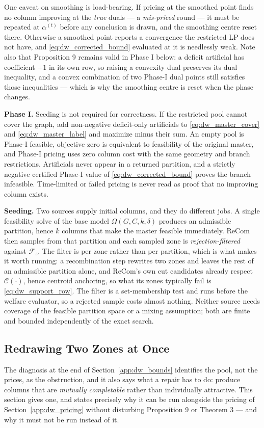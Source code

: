 \documentclass{article}
\begin{document}
One caveat on smoothing is load-bearing. If pricing at the smoothed point finds
no column improving at the \emph{true} duals --- a \emph{mis-priced} round --- it
must be repeated at $\alpha^{(t)}$ before any conclusion is drawn, and the
smoothing centre reset there. Otherwise a smoothed point reports a convergence
the restricted LP does not have, and \eqref{eq:dw_corrected_bound} evaluated at
it is needlessly weak. Note also that Proposition 9 remains valid in Phase I
below: a deficit artificial has coefficient $+1$ in its own row, so raising a
convexity dual preserves its dual inequality, and a convex combination of two
Phase-I dual points still satisfies those inequalities --- which is why the
smoothing centre is reset when the phase changes.

\noindent\textbf{Phase I.} Seeding is not required for correctness. If the
restricted pool cannot cover the graph, add non-negative deficit-only
artificials to \eqref{eq:dw_master_cover} and \eqref{eq:dw_master_label} and
maximize minus their sum. An empty pool is Phase-I feasible, objective zero is
equivalent to feasibility of the original master, and Phase-I pricing uses zero
column cost with the same geometry and branch restrictions. Artificials never
appear in a returned partition, and a strictly negative certified Phase-I value
of \eqref{eq:dw_corrected_bound} proves the branch infeasible. Time-limited or
failed pricing is never read as proof that no improving column exists.

\noindent\textbf{Seeding.} Two sources supply initial columns, and they do
different jobs. A single feasibility solve of the base model
$\Omega(G, C, k, \delta)$ produces an admissible partition, hence $k$ columns
that make the master feasible immediately. ReCom then samples from that
partition and each sampled zone is \emph{rejection-filtered} against
$\mathcal F_z$. The filter is per zone rather than per partition, which is what
makes it worth running: a recombination step rewrites two zones and leaves the
rest of an admissible partition alone, and ReCom's own cut candidates already
respect $\mathcal C(\cdot)$, hence centroid anchoring, so what its zones
typically fail is \eqref{eq:dw_support_row}. The filter is a set-membership test
and runs before the welfare evaluator, so a rejected sample costs almost
nothing. Neither source needs coverage of the feasible partition space or a
mixing assumption; both are finite and bounded independently of the exact
search.

\subsection{Redrawing Two Zones at Once}
\label{app:dw_redraw}
The diagnosis at the end of Section~\ref{app:dw_bounds} identifies the pool,
not the prices, as the obstruction, and it also says what a repair has to do:
produce columns that are \emph{mutually completable} rather than individually
attractive. This section gives one, and states precisely why it can be run
alongside the pricing of Section~\ref{app:dw_pricing} without disturbing
Proposition 9 or Theorem 3 --- and why it must not be run instead of it.
\end{document}
